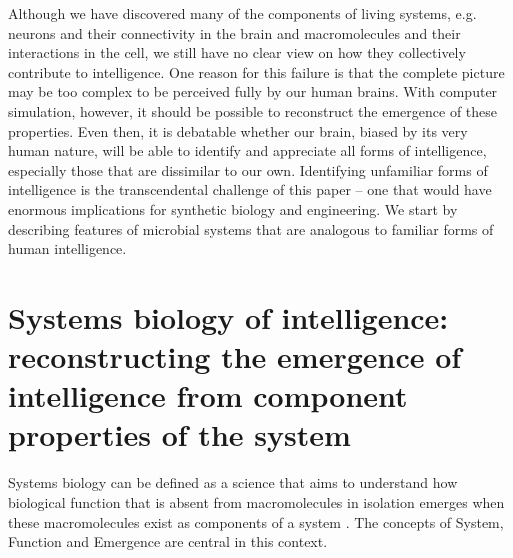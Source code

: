 Although we have discovered many of the components of living systems, e.g. neurons and their connectivity in the brain \cite{alivisatos_brain_2012,ahrens_whole-brain_2013} and macromolecules and their interactions in the cell, we still have no clear view on how they collectively contribute to intelligence. One reason for this failure is that the complete picture may be too complex to be perceived fully by our human brains. With computer simulation, however, it should be possible to reconstruct the emergence of these properties. Even then, it is debatable whether our brain, biased by its very human nature, will be able to identify and appreciate all forms of intelligence, especially those that are dissimilar to our own. Identifying unfamiliar forms of intelligence is the transcendental challenge of this paper – one that would have enormous implications for synthetic biology and engineering. We start by describing features of microbial systems that are analogous to familiar forms of human intelligence.

\section{Systems biology of intelligence: reconstructing the emergence of intelligence from component properties of the system}

Systems biology can be defined as a science that aims to understand how biological function that is absent from macromolecules in isolation emerges when these macromolecules exist as components of a system \cite{alberghina_systems_2007,westerhoff_systems_2009}. The concepts of System, Function and Emergence are central in this context.

